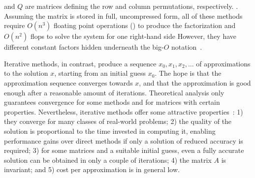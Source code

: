 and $Q$ are matrices defining the row and column permutations, respectively.
.
Assuming the matrix is stored in full, uncompressed form, all of these methods
require $O(n^3)$ floating point operations () to produce the
factorization and $O(n^2)$ flops to solve the system for one right-hand side
However, they have different constant factors hidden underneath the big-$O$
notation~\cite{big-o}.

Iterative methods, in contrast, produce a sequence $x_0, x_1, x_2, \ldots$ of
approximations to the solution $x$, starting from an initial guess $x_0$. The
hope is that the approximation sequence converges towards $x$, and that the
approximation is
good enough after a reasonable amount of iterations. Theoretical analysis only
guarantees convergence for some methods and for matrices with certain
properties. Nevertheless, iterative methods offer some attractive
properties~\cite{saad}: 1) they converge for many classes of real-world
problems; 2) the quality of the solution is proportional to the time
invested in computing it, enabling performance gains over direct methods if only
a solution of reduced accuracy is required; 3) for some matrices and a
suitable initial guess, even a fully accurate solution can be obtained in only a
couple of iterations; 4) the matrix $A$ is invariant; and 5) cost per
approximation is in general low.

